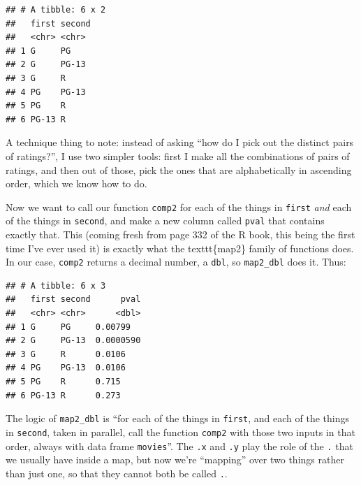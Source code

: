 \documentclass[]{tufte-book}
\newenvironment{Shaded}{}{}
\newcommand{\DataTypeTok}[1]{\textcolor[rgb]{0.56,0.13,0.00}{#1}}
\newcommand{\KeywordTok}[1]{\textcolor[rgb]{0.00,0.44,0.13}{\textbf{#1}}}
\newcommand{\NormalTok}[1]{#1}
\newcommand{\OperatorTok}[1]{\textcolor[rgb]{0.40,0.40,0.40}{#1}}
\newcommand{\StringTok}[1]{\textcolor[rgb]{0.25,0.44,0.63}{#1}}
\theoremstyle{definition}
\theoremstyle{definition}
\theoremstyle{definition}
\theoremstyle{remark}
\begin{document}
\begin{verbatim}
## # A tibble: 6 x 2
##   first second
##   <chr> <chr> 
## 1 G     PG    
## 2 G     PG-13 
## 3 G     R     
## 4 PG    PG-13 
## 5 PG    R     
## 6 PG-13 R
\end{verbatim}

A technique thing to note: instead of asking ``how do I pick out the
distinct pairs of ratings?'', I use two simpler tools: first I make all
the combinations of pairs of ratings, and then out of those, pick the
ones that are alphabetically in ascending order, which we know how to
do.

Now we want to call our function \texttt{comp2} for each of the things
in \texttt{first} \emph{and} each of the things in \texttt{second}, and
make a new column called \texttt{pval} that contains exactly that. This
(coming fresh from page 332 of the R book, this being the first time
I've ever used it)
 is exactly
what the texttt\{map2\} family of functions does. In our case,
\texttt{comp2} returns a decimal number, a \texttt{dbl}, so
\texttt{map2\_dbl} does it. Thus:

\begin{Shaded}
\end{Shaded}

\begin{verbatim}
## # A tibble: 6 x 3
##   first second      pval
##   <chr> <chr>      <dbl>
## 1 G     PG     0.00799  
## 2 G     PG-13  0.0000590
## 3 G     R      0.0106   
## 4 PG    PG-13  0.0106   
## 5 PG    R      0.715    
## 6 PG-13 R      0.273
\end{verbatim}

The logic of \texttt{map2\_dbl} is ``for each of the things in
\texttt{first}, and each of the things in \texttt{second}, taken in
parallel, call the function \texttt{comp2} with those two inputs in that
order, always with data frame \texttt{movies}''. The \texttt{.x} and
\texttt{.y} play the role of the \texttt{.} that we usually have inside
a map, but now we're ``mapping'' over two things rather than just one,
so that they cannot both be called \texttt{.}.
\end{document}

